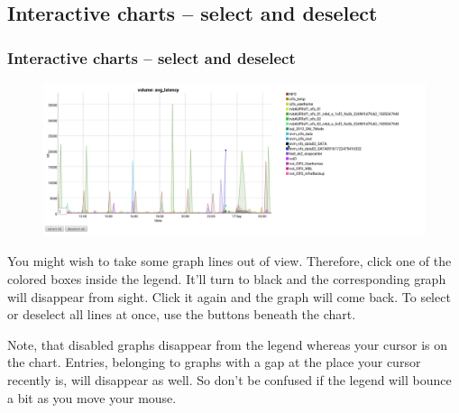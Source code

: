 \documentclass[8pt]{beamer}
\begin{document}
\subsection{Interactive charts -- select and deselect}
\begin{frame}
\frametitle{Interactive charts -- select and deselect} 
\begin{figure}
	\includegraphics[width=\textwidth]{../images/PicDat_deselect.png}
\end{figure}

You might wish to take some graph lines out of view. Therefore, click one of the colored boxes inside the legend. It'll turn to black and the corresponding graph will disappear from sight. Click it again and the graph will come back. To select or deselect all lines at once, use the buttons beneath the chart.

Note, that disabled graphs disappear from the legend whereas your cursor is on the chart. Entries, belonging to graphs with a gap at the place your cursor recently is, will disappear as well. So don't be confused if the legend will bounce a bit as you move your mouse.
\end{frame}
\end{document}
